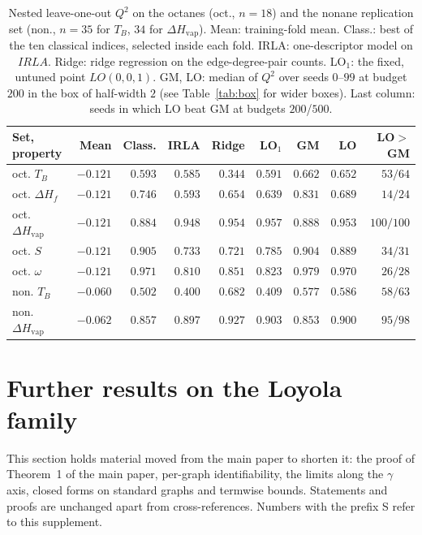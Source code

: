 \documentclass[a5paper, 10pt]{article}
\theoremstyle{plain}
\theoremstyle{remark}
\theoremstyle{definition}
\begin{document}
\begin{table}[htbp]
\centering
\caption{Nested leave-one-out $Q^2$ on the octanes (oct., $n = 18$) and
the nonane replication set (non., $n = 35$ for $T_B$, $34$ for
$\Delta H_{\mathrm{vap}}$). Mean: training-fold mean. Class.: best of the
ten classical indices, selected inside each fold. IRLA: one-descriptor
model on $IRLA$. Ridge: ridge regression on the edge-degree-pair counts.
LO$_1$: the fixed, untuned point $LO(0,0,1)$. GM, LO: median of $Q^2$
over seeds $0$--$99$ at budget $200$ in the box of half-width $2$
(see Table~\ref{tab:box} for wider boxes). Last column: seeds in which
LO beat GM at budgets $200$/$500$.}
\label{tab:external}
\small
\setlength{\tabcolsep}{2pt}
\begin{tabular}{lrrrrrrrr}
\toprule
Set, property & Mean & Class. & IRLA & Ridge & LO$_1$ & GM & LO & LO$>$GM\\
\midrule
oct. $T_B$ & $-0.121$ & $0.593$ & $0.585$ & $0.344$ & $0.591$ & $0.662$ & $0.652$ & $53/64$\\
oct. $\Delta H_f$ & $-0.121$ & $0.746$ & $0.593$ & $0.654$ & $0.639$ & $0.831$ & $0.689$ & $14/24$\\
oct. $\Delta H_{\mathrm{vap}}$ & $-0.121$ & $0.884$ & $0.948$ & $0.954$ & $0.957$ & $0.888$ & $0.953$ & $100/100$\\
oct. $S$ & $-0.121$ & $0.905$ & $0.733$ & $0.721$ & $0.785$ & $0.904$ & $0.889$ & $34/31$\\
oct. $\omega$ & $-0.121$ & $0.971$ & $0.810$ & $0.851$ & $0.823$ & $0.979$ & $0.970$ & $26/28$\\
non. $T_B$ & $-0.060$ & $0.502$ & $0.400$ & $0.682$ & $0.409$ & $0.577$ & $0.586$ & $58/63$\\
non. $\Delta H_{\mathrm{vap}}$ & $-0.062$ & $0.857$ & $0.897$ & $0.927$ & $0.903$ & $0.853$ & $0.900$ & $95/98$\\
\bottomrule
\end{tabular}
\end{table}

\FloatBarrier
\section{Further results on the Loyola family}\label{sec:s-math}

This section holds material moved from the main paper to shorten it: the proof of
Theorem~1 of the main paper, per-graph identifiability, the limits along the $\gamma$ axis, closed forms
on standard graphs and termwise bounds. Statements and proofs are unchanged apart from
cross-references. Numbers with the prefix S refer to this supplement.
\end{document}
